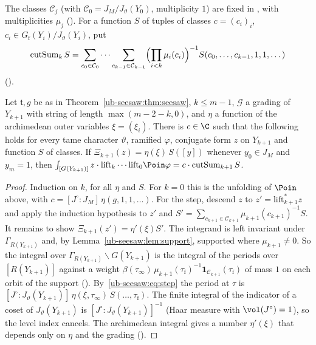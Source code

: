 The classes $\mathcal C_j$ (with $\mathcal C_0=J_M/J_\vartheta(Y_0)$, multiplicity $1$) are fixed in
, with multiplicities $\mu_j$ (). For a function
$S$ of tuples of classes $c=(c_i)_i$, $c_i\in G_{\mathrm f}(Y_i)/J_\vartheta(Y_i)$, put
\[
  \operatorname{cutSum}_k S=\sum_{c_0\in\mathcal C_0}\cdots\sum_{c_{k-1}\in\mathcal C_{k-1}}
  \Bigl(\prod_{i<k}\mu_i(c_i)\Bigr)^{-1}S(c_0,\dots,c_{k-1},1,1,\dots)
\]
().

\begin{proposition}\label{ub-seesaw:prop:outer}
Let $\mathfrak t,g$ be as in Theorem~\ref{ub-seesaw:thm:seesaw}, $k\le m-1$, $\mathcal G$ a grading of $Y_{k+1}$ with
string of length $\max(m-2-k,0)$, and $\eta$ a function of the archimedean outer variables
$\xi=(\xi_i)$. There is $c\in\C$ such that the following holds for every tame character
$\vartheta$, ramified $\varphi$, conjugate form $z$ on $Y_{k+1}$ and function $S$ of classes. If
$\Xi_{k+1}(z)=\eta(\xi)\,S([y])$ whenever $y_0\in J_M$ and $y_m=1$, then
$\int_{[G(Y_{k+1})]}z\cdot\mathrm{lift}_k\cdots\mathrm{lift}_0\Poin\varphi=c\cdot\operatorname{cutSum}_{k+1}S$.
\end{proposition}

\begin{proof}
Induction on $k$, for all $\eta$ and $S$. For $k=0$ this is the unfolding of $\Poin$ above, with
$c=[J^\circ:J_M]\,\eta(g,1,1,\dots)$. For the step, descend $z$ to $z'=\mathrm{lift}_{k+1}^*z$ and apply
the induction hypothesis to $z'$ and $S'=\sum_{c_{k+1}\in\mathcal C_{k+1}}\mu_{k+1}(c_{k+1})^{-1}S$. It
remains to show $\Xi_{k+1}(z')=\eta'(\xi)S'$. The integrand is left invariant under $\Gamma_{R(Y_{k+1})}$
and, by Lemma~\ref{ub-seesaw:lem:support}, supported where $\mu_{k+1}\neq0$. So the integral over
$\Gamma_{R(Y_{k+1})}\backslash G(Y_{k+1})$ is the integral of the periods over $[R(Y_{k+1})]$ against a weight
$\beta(\tau_\infty)\,\mu_{k+1}(\tau_{\mathrm f})^{-1}\mathbf 1_{\mathcal C_{k+1}}(\tau_{\mathrm f})$ of mass $1$ on each orbit of
the support (). By~\eqref{ub-seesaw:eq:step}
the period at $\tau$ is $[J^\circ:J_\vartheta(Y_{k+1})]\,\eta(\xi,\tau_\infty)\,S(\dots,\tau_{\mathrm f})$. The finite
integral of the indicator of a coset of $J_\vartheta(Y_{k+1})$ is $[J^\circ:J_\vartheta(Y_{k+1})]^{-1}$
(Haar measure with $\vol(J^\circ)=1$), so the level index cancels. The archimedean integral gives a number $\eta'(\xi)$ that depends only on $\eta$
and the grading ().
\end{proof}

